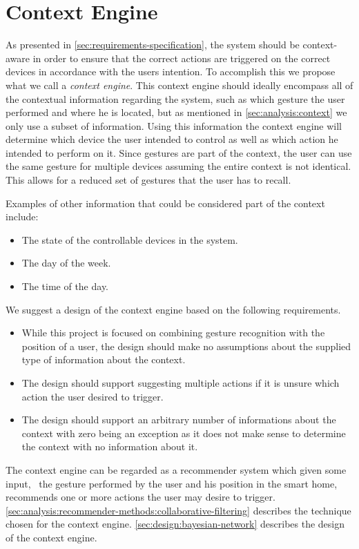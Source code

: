 \section{Context Engine}
\label{sec:analysis:context-engine}

As presented in \cref{sec:requirements-specification}, the system should be context-aware in order to ensure that the correct actions are triggered on the correct devices in accordance with the users intention.
To accomplish this we propose what we call a \emph{context engine}.
This context engine should ideally encompass all of the contextual information regarding the system, such as which gesture the user performed and where he is located, but as mentioned in \cref{sec:analysis:context} we only use a subset of information. 
Using this information the context engine will determine which device the user intended to control as well as which action he intended to perform on it.
Since gestures are part of the context, the user can use the same gesture for multiple devices assuming the entire context is not identical.
This allows for a reduced set of gestures that the user has to recall.

Examples of other information that could be considered part of the context include:

\begin{itemize}
\item The state of the controllable devices in the system.
\item The day of the week.
\item The time of the day.
\end{itemize}

We suggest a design of the context engine based on the following requirements.

\begin{itemize}
\item While this project is focused on combining gesture recognition with the position of a user, the design should make no assumptions about the supplied type of information about the context.
\item The design should support suggesting multiple actions if it is unsure which action the user desired to trigger.
\item The design should support an arbitrary number of informations about the context with zero being an exception as it does not make sense to determine the context with no information about it.
\end{itemize}

The context engine can be regarded as a recommender system which given some input, \eg~the gesture performed by the user and his position in the smart home, recommends one or more actions the user may desire to trigger. \cref{sec:analysis:recommender-methods:collaborative-filtering} describes the technique chosen for the context engine. \cref{sec:design:bayesian-network} describes the design of the context engine.

